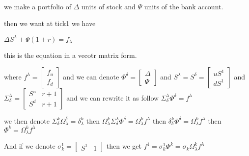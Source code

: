 \documentclass{article}
\theoremstyle{definition} %
\begin{document}
we make a portfolio of $\Delta$ units of
stock and $\Psi$ units of the bank account.

then we want at tick1 we have

$\Delta S^\lambda+\Psi(1+r)=f_\lambda$

this is the equation in a vecotr matrix form.

where
$f^\lambda=
    \begin{bmatrix}
        f_u \\
        f_d
    \end{bmatrix}
$
and we can denote
$\Phi^\delta=
    \begin{bmatrix}
        \Delta \\
        \Psi
    \end{bmatrix}
$
and
$S^\lambda=S^\delta=
    \begin{bmatrix}
        uS^1 \\
        dS^1
    \end{bmatrix}
$
and
$\Sigma^\lambda_\delta=
    \begin{bmatrix}
        S^u & r+1 \\
        S^d & r+1
    \end{bmatrix}
$
and we can rewrite it as follow
$\Sigma^\lambda_\delta \Phi^\delta=f^\lambda$

we then denote $\Sigma^k_\delta \Omega_\lambda^\delta=\delta^k_\lambda$
then
$\Omega_\lambda^k\Sigma^\lambda_\delta \Phi^\delta=\Omega_\lambda^kf^\lambda$
then
$\delta^k_\delta\Phi^\delta=\Omega_\lambda^kf^\lambda$
then
$\Phi^k=\Omega_\lambda^kf^\lambda$

And if we denote
$\sigma^1_k=
    \begin{bmatrix}
        S^1 & 1
    \end{bmatrix}
$
then we get
$f^1=\sigma^1_k\Phi^k=\sigma_k\Omega_\lambda^kf^\lambda$
\end{document}
